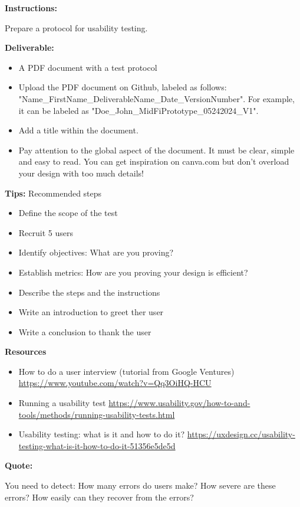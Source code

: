 \makeheaderfiles

\textbf{Instructions:}

Prepare a protocol for usability testing.

\textbf{Deliverable:}

\begin{itemize}
\item A PDF document with a test protocol
\item Upload the PDF document on Github, labeled as follows: "Name\_FirstName\_DeliverableName\_Date\_VersionNumber". For example, it can be labeled as "Doe\_John\_MidFiPrototype\_05242024\_V1".
\item Add a title within the document.
\item Pay attention to the global aspect of the document. It must be clear, simple and easy to read. You can get inspiration on canva.com but don't overload your design with too much details!
\end{itemize}

\textbf{Tips:} Recommended steps

\begin{itemize}
\item Define the scope of the test
\item Recruit 5 users
\item Identify objectives: What are you proving?
\item Establish metrics:  How are you proving your design is efficient?
\item Describe the steps and the instructions
\item Write an introduction to greet ther user
\item Write a conclusion to thank the user
\end{itemize}

\textbf{Resources}

\begin{itemize}
\item How to do a user interview (tutorial from Google Ventures) \url{https://www.youtube.com/watch?v=Qq3OiHQ-HCU}
\item Running a usability test \url{https://www.usability.gov/how-to-and-tools/methods/running-usability-tests.html}
\item Usability testing: what is it and how to do it? \url{https://uxdesign.cc/usability-testing-what-is-it-how-to-do-it-51356e5de5d}
\end{itemize}

\textbf{Quote:}

You need to detect: How many errors do users make? How severe are these errors? How easily can they recover from the errors?

